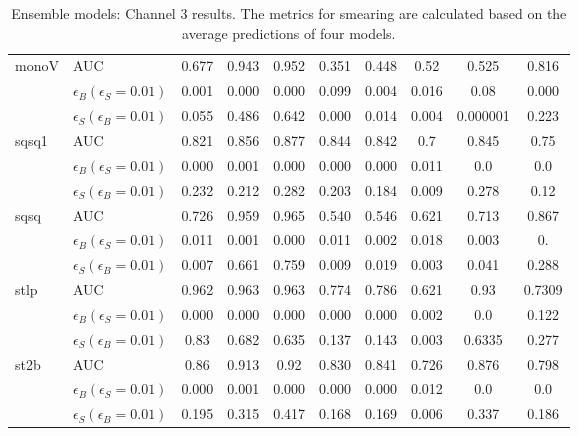 \begin{table}[H]
\begin{tabular}{ll|ccc|cc|ccc}
    \hline
    \multirow{3}{*}{monoV} & AUC    & 0.677 & 0.943 & 0.952 & 0.351 & 0.448 & 0.52 & 0.525 & 0.816 \\
    & $\epsilon_B(\epsilon_S=0.01)$  & 0.001 & 0.000 & 0.000 & 0.099 & 0.004 & 0.016 & 0.08 & 0.000 \\
    & $\epsilon_S(\epsilon_B=0.01)$  & 0.055 & 0.486 & 0.642 & 0.000 & 0.014 & 0.004 & 0.000001 & 0.223 \\
    \hline
    \multirow{3}{*}{sqsq1} & AUC    & 0.821 & 0.856 & 0.877 & 0.844 & 0.842 & 0.7 & 0.845 & 0.75 \\
    & $\epsilon_B(\epsilon_S=0.01)$  & 0.000 & 0.001 & 0.000 & 0.000 & 0.000 & 0.011 & 0.0 & 0.0 \\
    & $\epsilon_S(\epsilon_B=0.01)$  & 0.232 & 0.212 & 0.282 & 0.203 & 0.184 & 0.009 & 0.278 & 0.12 \\
    \hline
    \multirow{3}{*}{sqsq} & AUC    & 0.726 & 0.959 & 0.965 & 0.540 & 0.546 & 0.621 & 0.713 & 0.867 \\
    & $\epsilon_B(\epsilon_S=0.01)$  & 0.011 & 0.001 & 0.000 & 0.011 & 0.002 & 0.018 & 0.003 & 0. \\
    & $\epsilon_S(\epsilon_B=0.01)$  & 0.007 & 0.661 & 0.759 & 0.009 & 0.019 & 0.003 & 0.041 & 0.288 \\
    \hline
    \multirow{3}{*}{stlp} & AUC    & 0.962 & 0.963 & 0.963 & 0.774 & 0.786 & 0.621 & 0.93 & 0.7309 \\
    & $\epsilon_B(\epsilon_S=0.01)$  & 0.000 & 0.000 & 0.000 & 0.000 & 0.000 & 0.002 & 0.0 & 0.122 \\
    & $\epsilon_S(\epsilon_B=0.01)$  & 0.83 & 0.682 & 0.635 & 0.137 & 0.143 & 0.003 & 0.6335 & 0.277 \\
    \hline
    \multirow{3}{*}{st2b} & AUC    & 0.86 & 0.913 & 0.92 & 0.830 & 0.841 & 0.726 & 0.876 & 0.798 \\
    & $\epsilon_B(\epsilon_S=0.01)$  & 0.000 & 0.001 & 0.000 & 0.000 & 0.000 & 0.012 & 0.0 & 0.0 \\
    & $\epsilon_S(\epsilon_B=0.01)$  & 0.195 & 0.315 & 0.417 & 0.168 & 0.169 & 0.006 & 0.337 & 0.186 \\
    \hline
    \end{tabular}
    \caption{Ensemble models: Channel 3 results. The metrics for smearing are calculated based on the average predictions of four models.}
    \label{tab:ch3_all}
    \end{table}
    